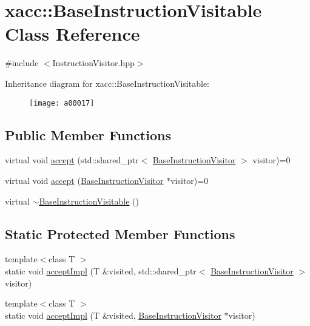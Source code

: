 \hypertarget{a00017}{}\section{xacc\+:\+:Base\+Instruction\+Visitable Class Reference}
\label{a00017}


{\ttfamily \#include $<$Instruction\+Visitor.\+hpp$>$}

Inheritance diagram for xacc\+:\+:Base\+Instruction\+Visitable\+:\begin{figure}[H]
\begin{center}
\leavevmode
\texttt{[image: a00017]}
\end{center}
\end{figure}
\subsection*{Public Member Functions}
\begin{DoxyCompactItemize}
\item 
virtual void \hyperlink{a00017_a4ae295a7f83d57c6f1f912adc90274ea}{accept} (std\+::shared\+\_\+ptr$<$ \hyperlink{a00018}{Base\+Instruction\+Visitor} $>$ visitor)=0
\item 
virtual void \hyperlink{a00017_ad6b9ad95c14580cc86ca87cd464262c3}{accept} (\hyperlink{a00018}{Base\+Instruction\+Visitor} $\ast$visitor)=0
\item 
virtual \hyperlink{a00017_a3a291d247b18ea7620dd8d97dfb595f4}{$\sim$\+Base\+Instruction\+Visitable} ()
\end{DoxyCompactItemize}
\subsection*{Static Protected Member Functions}
\begin{DoxyCompactItemize}
\item 
{\footnotesize template$<$class T $>$ }\\static void \hyperlink{a00017_a2f18b9fcb48f42d190a9f5180b7b59c5}{accept\+Impl} (T \&visited, std\+::shared\+\_\+ptr$<$ \hyperlink{a00018}{Base\+Instruction\+Visitor} $>$ visitor)
\item 
{\footnotesize template$<$class T $>$ }\\static void \hyperlink{a00017_a80c7bb995faa54644f822fa48176c6cb}{accept\+Impl} (T \&visited, \hyperlink{a00018}{Base\+Instruction\+Visitor} $\ast$visitor)
\end{DoxyCompactItemize}


